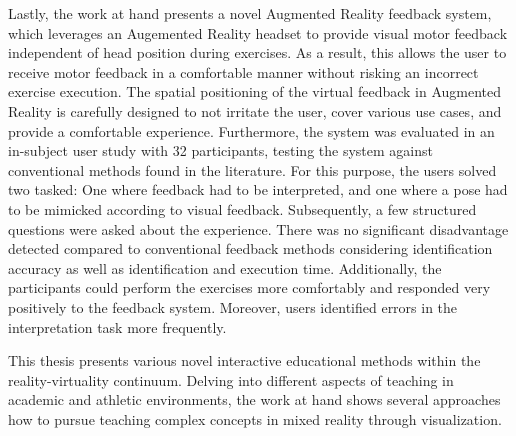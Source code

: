 Lastly, the work at hand presents a novel Augmented Reality feedback system, which leverages an Augemented Reality headset to provide visual motor feedback independent of head position during exercises.
As a result, this allows the user to receive motor feedback in a comfortable manner without risking an incorrect exercise execution.
The spatial positioning of the virtual feedback in Augmented Reality is carefully designed to not irritate the user, cover various use cases, and provide a comfortable experience.
Furthermore, the system was evaluated in an in-subject user study with 32 participants, testing the system against conventional methods found in the literature.
For this purpose, the users solved two tasked: One where feedback had to be interpreted, and one where a pose had to be mimicked according to visual feedback.
Subsequently, a few structured questions were asked about the experience.
There was no significant disadvantage detected compared to conventional feedback methods considering identification accuracy as well as identification and execution time.
Additionally, the participants could perform the exercises more comfortably and responded very positively to the feedback system.
Moreover, users identified errors in the interpretation task more frequently.

This thesis presents various novel interactive educational methods within the reality-virtuality continuum.
Delving into different aspects of teaching in academic and athletic environments, the work at hand shows several approaches how to pursue teaching complex concepts in mixed reality through visualization.